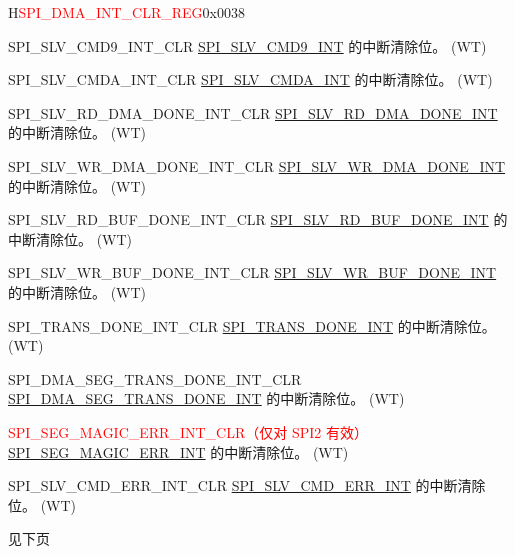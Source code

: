\begin{register}{H}{\textcolor{red}{SPI\_DMA\_INT\_CLR\_REG}}{0x{}0038}
\begin{regdesc}
\begin{reglist}
\label{fielddesc:SPISLVCMD9INTCLR}\item [SPI\_SLV\_CMD9\_INT\_CLR] \hyperref[int:SPISLVCMD9INT]{SPI\_SLV\_CMD9\_INT} 的中断清除位。 (WT)
\label{fielddesc:SPISLVCMDAINTCLR}\item [SPI\_SLV\_CMDA\_INT\_CLR] \hyperref[int:SPISLVCMDAINT]{SPI\_SLV\_CMDA\_INT} 的中断清除位。 (WT)
\label{fielddesc:SPISLVRDDMADONEINTCLR}\item [SPI\_SLV\_RD\_DMA\_DONE\_INT\_CLR] \hyperref[int:SPISLVRDDMADONEINT]{SPI\_SLV\_RD\_DMA\_DONE\_INT} 的中断清除位。 (WT)
\label{fielddesc:SPISLVWRDMADONEINTCLR}\item [SPI\_SLV\_WR\_DMA\_DONE\_INT\_CLR] \hyperref[int:SPISLVWRDMADONEINT]{SPI\_SLV\_WR\_DMA\_DONE\_INT} 的中断清除位。 (WT)
\label{fielddesc:SPISLVRDBUFDONEINTCLR}\item [SPI\_SLV\_RD\_BUF\_DONE\_INT\_CLR] \hyperref[int:SPISLVRDBUFDONEINT]{SPI\_SLV\_RD\_BUF\_DONE\_INT} 的中断清除位。 (WT)
\label{fielddesc:SPISLVWRBUFDONEINTCLR}\item [SPI\_SLV\_WR\_BUF\_DONE\_INT\_CLR] \hyperref[int:SPISLVWRBUFDONEINT]{SPI\_SLV\_WR\_BUF\_DONE\_INT} 的中断清除位。 (WT)
\label{fielddesc:SPITRANSDONEINTCLR}\item [SPI\_TRANS\_DONE\_INT\_CLR] \hyperref[int:SPITRANSDONEINT]{SPI\_TRANS\_DONE\_INT} 的中断清除位。 (WT)
\label{fielddesc:SPIDMASEGTRANSDONEINTCLR}\item [SPI\_DMA\_SEG\_TRANS\_DONE\_INT\_CLR] \hyperref[int:SPIDMASEGTRANSDONEINT]{SPI\_DMA\_SEG\_TRANS\_DONE\_INT} 的中断清除位。 (WT)
\label{fielddesc:SPISEGMAGICERRINTCLR}\item [\textcolor{red}{SPI\_SEG\_MAGIC\_ERR\_INT\_CLR（仅对 SPI2 有效）}] \hyperref[int:SPISEGMAGICERRINT]{SPI\_SEG\_MAGIC\_ERR\_INT} 的中断清除位。 (WT)
\label{fielddesc:SPISLVCMDERRINTCLR}\item [SPI\_SLV\_CMD\_ERR\_INT\_CLR] \hyperref[int:SPISLVCMDERRINT]{SPI\_SLV\_CMD\_ERR\_INT} 的中断清除位。 (WT)

\item [见下页]
\end{reglist}\end{regdesc}
\end{register}

